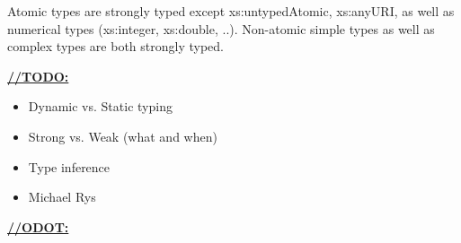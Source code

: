 Atomic types are strongly typed except xs:untypedAtomic, xs:anyURI, as well as
numerical types (xs:integer, xs:double, ..). Non-atomic simple types as well as
complex types are both strongly typed.

\underline{\textbf{\LARGE //TODO:}}
\begin{itemize}
  \item Dynamic vs. Static typing
  \item Strong vs. Weak (what and when)
  \item Type inference
  \item Michael Rys
\end{itemize}

\underline{\textbf{\LARGE //ODOT:}}